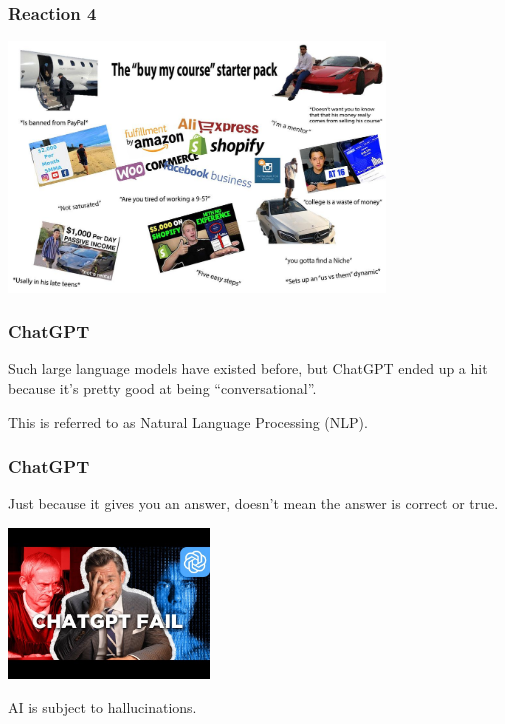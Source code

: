 \begin{frame}
\frametitle{Reaction 4}

\begin{center}
	\includegraphics[width=0.75\textwidth]{images/starterpack.jpg}
\end{center}

\end{frame}


\begin{frame}
\frametitle{ChatGPT}

Such large language models have existed before, but ChatGPT ended up a hit because it's pretty good at being ``conversational''.

This is referred to as Natural Language Processing (NLP).

\end{frame}

\begin{frame}
\frametitle{ChatGPT}

Just because it gives you an answer, doesn't mean the answer is correct or true.

\begin{center}
	\includegraphics[width=0.4\textwidth]{images/le-failed.jpg}
\end{center}

AI is subject to \alert{hallucinations}.

\end{frame}

